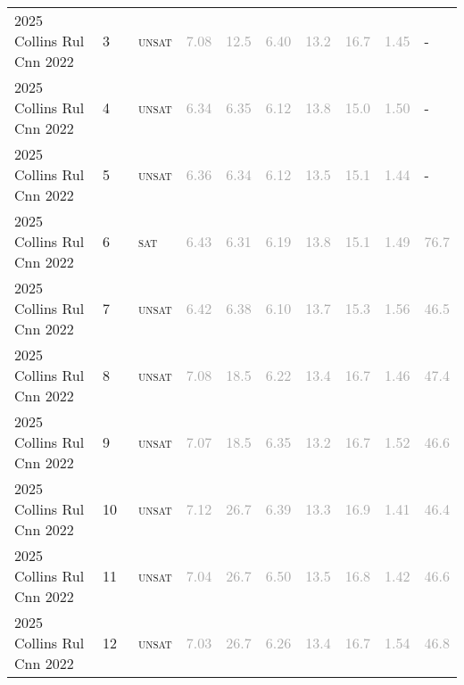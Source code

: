 \begin{center}
{\begin{longtable}{@{}llllllllll@{}}
2025 Collins Rul Cnn 2022 & 3 & ~\textsc{unsat} & \textcolor{darkgray}{7.08} & \textcolor{darkgray}{12.5} & \textcolor{darkgray}{6.40} & \textcolor{darkgray}{13.2} & \textcolor{darkgray}{16.7} & \textcolor{darkgray}{1.45} & - \\
2025 Collins Rul Cnn 2022 & 4 & ~\textsc{unsat} & \textcolor{darkgray}{6.34} & \textcolor{darkgray}{6.35} & \textcolor{darkgray}{6.12} & \textcolor{darkgray}{13.8} & \textcolor{darkgray}{15.0} & \textcolor{darkgray}{1.50} & - \\
2025 Collins Rul Cnn 2022 & 5 & ~\textsc{unsat} & \textcolor{darkgray}{6.36} & \textcolor{darkgray}{6.34} & \textcolor{darkgray}{6.12} & \textcolor{darkgray}{13.5} & \textcolor{darkgray}{15.1} & \textcolor{darkgray}{1.44} & - \\
2025 Collins Rul Cnn 2022 & 6 & ~\textsc{sat} & \textcolor{darkgray}{6.43} & \textcolor{darkgray}{6.31} & \textcolor{darkgray}{6.19} & \textcolor{darkgray}{13.8} & \textcolor{darkgray}{15.1} & \textcolor{darkgray}{1.49} & \textcolor{darkgray}{76.7} \\
2025 Collins Rul Cnn 2022 & 7 & ~\textsc{unsat} & \textcolor{darkgray}{6.42} & \textcolor{darkgray}{6.38} & \textcolor{darkgray}{6.10} & \textcolor{darkgray}{13.7} & \textcolor{darkgray}{15.3} & \textcolor{darkgray}{1.56} & \textcolor{darkgray}{46.5} \\
2025 Collins Rul Cnn 2022 & 8 & ~\textsc{unsat} & \textcolor{darkgray}{7.08} & \textcolor{darkgray}{18.5} & \textcolor{darkgray}{6.22} & \textcolor{darkgray}{13.4} & \textcolor{darkgray}{16.7} & \textcolor{darkgray}{1.46} & \textcolor{darkgray}{47.4} \\
2025 Collins Rul Cnn 2022 & 9 & ~\textsc{unsat} & \textcolor{darkgray}{7.07} & \textcolor{darkgray}{18.5} & \textcolor{darkgray}{6.35} & \textcolor{darkgray}{13.2} & \textcolor{darkgray}{16.7} & \textcolor{darkgray}{1.52} & \textcolor{darkgray}{46.6} \\
2025 Collins Rul Cnn 2022 & 10 & ~\textsc{unsat} & \textcolor{darkgray}{7.12} & \textcolor{darkgray}{26.7} & \textcolor{darkgray}{6.39} & \textcolor{darkgray}{13.3} & \textcolor{darkgray}{16.9} & \textcolor{darkgray}{1.41} & \textcolor{darkgray}{46.4} \\
2025 Collins Rul Cnn 2022 & 11 & ~\textsc{unsat} & \textcolor{darkgray}{7.04} & \textcolor{darkgray}{26.7} & \textcolor{darkgray}{6.50} & \textcolor{darkgray}{13.5} & \textcolor{darkgray}{16.8} & \textcolor{darkgray}{1.42} & \textcolor{darkgray}{46.6} \\
2025 Collins Rul Cnn 2022 & 12 & ~\textsc{unsat} & \textcolor{darkgray}{7.03} & \textcolor{darkgray}{26.7} & \textcolor{darkgray}{6.26} & \textcolor{darkgray}{13.4} & \textcolor{darkgray}{16.7} & \textcolor{darkgray}{1.54} & \textcolor{darkgray}{46.8} \\

\end{longtable}}
\end{center}
